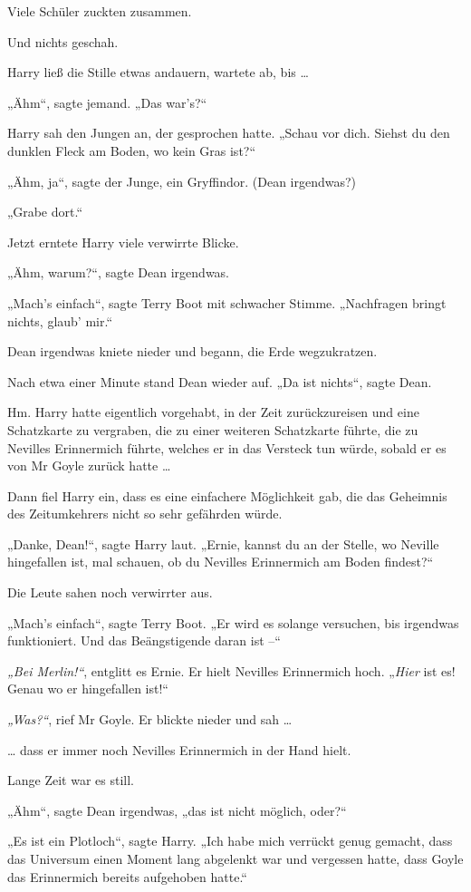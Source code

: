 {Viele Schüler zuckten zusammen.

Und nichts geschah.

Harry ließ die Stille etwas andauern, wartete ab, bis …

„Ähm“, sagte jemand. „Das war's?“

Harry sah den Jungen an, der gesprochen hatte. „Schau vor dich. Siehst du den dunklen Fleck am Boden, wo kein Gras ist?“

„Ähm, ja“, sagte der Junge, ein Gryffindor. (Dean irgendwas?)

„Grabe dort.“

Jetzt erntete Harry viele verwirrte Blicke.

„Ähm, warum?“, sagte Dean irgendwas.

„Mach's einfach“, sagte Terry Boot mit schwacher Stimme. „Nachfragen bringt nichts, glaub' mir.“

Dean irgendwas kniete nieder und begann, die Erde wegzukratzen.

Nach etwa einer Minute stand Dean wieder auf. „Da ist nichts“, sagte Dean.

Hm. Harry hatte eigentlich vorgehabt, in der Zeit zurückzureisen und eine Schatzkarte zu vergraben, die zu einer weiteren Schatzkarte führte, die zu Nevilles Erinnermich führte, welches er in das Versteck tun würde, sobald er es von Mr Goyle zurück hatte …

Dann fiel Harry ein, dass es eine einfachere Möglichkeit gab, die das Geheimnis des Zeitumkehrers nicht so sehr gefährden würde.

„Danke, Dean!“, sagte Harry laut. „Ernie, kannst du an der Stelle, wo Neville hingefallen ist, mal schauen, ob du Nevilles Erinnermich am Boden findest?“

Die Leute sahen noch verwirrter aus.

„Mach's einfach“, sagte Terry Boot. „Er wird es solange versuchen, bis irgendwas funktioniert. Und das Beängstigende daran ist --“

\emph{„Bei Merlin!“}, entglitt es Ernie. Er hielt Nevilles Erinnermich hoch. „\emph{Hier} ist es! Genau wo er hingefallen ist!“

\emph{„Was?“}, rief Mr Goyle. Er blickte nieder und sah …

… dass er immer noch Nevilles Erinnermich in der Hand hielt.

Lange Zeit war es still.

„Ähm“, sagte Dean irgendwas, „das ist nicht möglich, oder?“

„Es ist ein Plotloch“, sagte Harry. „Ich habe mich verrückt genug gemacht, dass das Universum einen Moment lang abgelenkt war und vergessen hatte, dass Goyle das Erinnermich bereits aufgehoben hatte.“

}
